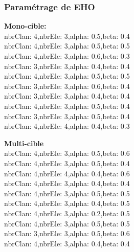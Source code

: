 \subsubsection{Paramétrage de EHO}
\noindent
\begin{minipage}[t]{0.55\textwidth}
	\textbf{Mono-cible:} \\
	 nbrClan: 4,nbrEle: 3,alpha: 0.5,beta: 0.4\\
	 nbrClan: 4,nbrEle: 3,alpha: 0.5,beta: 0.5\\
	 nbrClan: 4,nbrEle: 3,alpha: 0.6,beta: 0.3\\
	 nbrClan: 3,nbrEle: 3,alpha: 0.4,beta: 0.4\\
	 nbrClan: 4,nbrEle: 3,alpha: 0.5,beta: 0.5\\
	 nbrClan: 3,nbrEle: 3,alpha: 0.6,beta: 0.4\\
	 nbrClan: 3,nbrEle: 3,alpha: 0.4,beta: 0.4\\
	 nbrClan: 4,nbrEle: 3,alpha: 0.5,beta: 0.4\\
	 nbrClan: 3,nbrEle: 3,alpha: 0.5,beta: 0.4\\
	 nbrClan: 4,nbrEle: 4,alpha: 0.4,beta: 0.3\\

	
\end{minipage}\hfill
\hspace{0.2cm}
\begin{minipage}[t]{0.55\textwidth}
	\textbf{Multi-cible}\\
	 nbrClan: 4,nbrEle: 3,alpha: 0.5,beta: 0.6\\
	 nbrClan: 4,nbrEle: 3,alpha: 0.5,beta: 0.4\\
	 nbrClan: 4,nbrEle: 4,alpha: 0.4,beta: 0.6\\
	 nbrClan: 4,nbrEle: 3,alpha: 0.4,beta: 0.4\\
	 nbrClan: 4,nbrEle: 3,alpha: 0.5,beta: 0.5\\
	 nbrClan: 4,nbrEle: 3,alpha: 0.4,beta: 0.5\\
	 nbrClan: 4,nbrEle: 3,alpha: 0.2,beta: 0.5\\
	 nbrClan: 4,nbrEle: 3,alpha: 0.5,beta: 0.5\\
	 nbrClan: 3,nbrEle: 3,alpha: 0.5,beta: 0.6\\
	 nbrClan: 4,nbrEle: 3,alpha: 0.4,beta: 0.4\\

	
	
\end{minipage}\hfill

 
